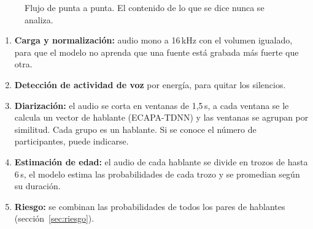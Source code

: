 \documentclass[11pt,a4paper]{article}
\begin{document}
\begin{figure}[H]
\centering
{}
\caption{Flujo de punta a punta. El contenido de lo que se dice nunca se analiza.}
\end{figure}

\begin{enumerate}
  \item \textbf{Carga y normalización:} audio mono a 16\,kHz con el volumen igualado, para que el modelo no aprenda que una fuente está grabada más fuerte que otra.
  \item \textbf{Detección de actividad de voz} por energía, para quitar los silencios.
  \item \textbf{Diarización:} el audio se corta en ventanas de 1,5\,s, a cada ventana se le calcula un vector de hablante (ECAPA-TDNN) y las ventanas se agrupan por similitud. Cada grupo es un hablante. Si se conoce el número de participantes, puede indicarse.
  \item \textbf{Estimación de edad:} el audio de cada hablante se divide en trozos de hasta 6\,s, el modelo estima las probabilidades de cada trozo y se promedian según su duración.
  \item \textbf{Riesgo:} se combinan las probabilidades de todos los pares de hablantes (sección~\ref{sec:riesgo}).
\end{enumerate}
\end{document}
